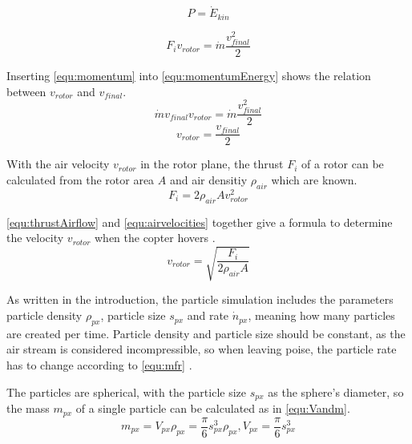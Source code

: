     \begin{equation}
    P = \dot E_{kin}
    \label{equ:consE}
    \end{equation}
    
    \begin{equation}
    F_i v_{rotor} = \dot m \frac{v_{final}^2}{2}
    \label{equ:momentumEnergy}
    \end{equation}
    
    Inserting \ref{equ:momentum} into \ref{equ:momentumEnergy} shows the relation between $v_{rotor}$ and $v_{final}$.
    \begin{equation}
    \dot m v_{final}  v_{rotor} = \dot m \frac{v_{final}^2}{2}
    \end{equation}
    \begin{equation}
     v_{rotor} = \frac{v_{final}}{2}
     \label{equ:airvelocities}
    \end{equation}
    
    With the air velocity $v_{rotor}$ in the rotor plane, the thrust $F_i$ of a rotor can be calculated from the rotor area $A$ and air densitiy $\rho_{air}$ which are known.
    \begin{equation}
    F_i = 2 \rho_{air} A v_{rotor}^2
    \label{equ:thrustAirflow}
    \end{equation}
    
    \ref{equ:thrustAirflow} and \ref{equ:airvelocities} together give a formula to determine the  velocity $v_{rotor}$  when the copter hovers .
    \begin{equation}
    v_{rotor}= \sqrt{\frac{ F_i}{2 \rho_{air} A}}
    \end{equation}
    
    As written in the introduction, the particle simulation includes the parameters particle density $\rho_{px}$, particle size $s_{px}$ and rate $\dot n_{px}$, meaning how many particles are created per time. 
    Particle density and particle size should be constant, as the air stream is considered incompressible, so when leaving poise, the particle rate has to change according to \ref{equ:mfr} \cite{deeg2006modeling}.
    
    The particles are spherical, with the particle size $s_{px}$ as the sphere's diameter, so the mass $m_{px}$ of a single particle can be calculated as in \ref{equ:Vandm}.
    \begin{equation}
    m_{px} = V_{px}  \rho_{px}  =  \frac{\pi}{6}s_{px}^3  \rho_{px},  V_{px}  = \frac{\pi}{6}s_{px}^3
    \label{equ:Vandm}
    \end{equation}
    
